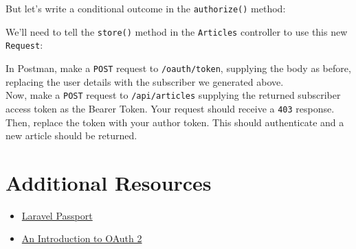 But let's write a conditional outcome in the \texttt{authorize()} method:


We'll need to tell the \texttt{store()} method in the \texttt{Articles} controller to use this new \texttt{Request}:



In Postman, make a \texttt{POST} request to \texttt{/oauth/token}, supplying the body as before, replacing the user details with the subscriber we generated above.
\\

Now, make a \texttt{POST} request to \texttt{/api/articles} supplying the returned subscriber access token as the Bearer Token. Your request should receive a \texttt{403} response. Then, replace the token with your author token. This should authenticate and a new article should be returned.

\section{Additional Resources}

\begin{itemize}[leftmargin=*]
    \item \href{https://laravel.com/docs/master/passport}{Laravel Passport}
    \item \href{https://www.digitalocean.com/community/tutorials/an-introduction-to-oauth-2}{An Introduction to OAuth 2}
\end{itemize}
